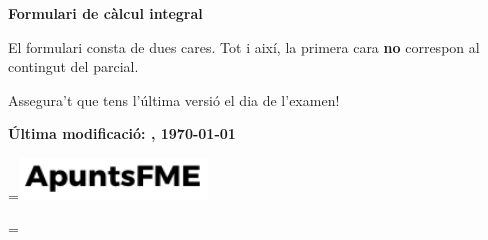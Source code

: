 \documentclass[12pt,a4paper]{article}
\newcommand*{\vcenteredhbox}[1]{\begingroup
\setbox0=\hbox{#1}\parbox{\wd0}{\box0}\endgroup}
\begin{document}
\vspace*{\fill}
\begin{center}
     \Huge {\bf Formulari de càlcul integral}
\end{center}

\quad

{\Large
    
    \begin{addmargin}[8em]{8em}
		El formulari consta de dues cares. Tot i aix\'i, la primera cara \textbf{no} correspon al contingut del parcial.
        
        \quad
        
        Assegura't que tens l'última versió el dia de l'examen!
        
        \quad
        
        \begin{flushright}
            {\bf Última modificació: \currenttime, \today}
        \end{flushright}
        
        \qquad
        
        \qquad
        
        \begin{center}
            \vcenteredhbox{\includegraphics[width=5cm]{../logo.pdf}} \qquad \qquad \vcenteredhbox{\doclicenseImage[imagewidth=7em]}
        \end{center}
    
    \end{addmargin}
}
\vspace*{\fill}
\newpage



\end{document}

